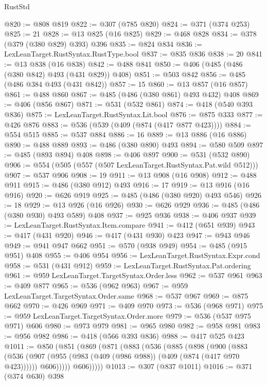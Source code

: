 \begin{lexlean}{RustStd}
\begin{coremodule}
{\begin{coremodule}
{{{{{{{{{{{@820 := @808 @819
@822 := @307 (@785 @820)
@824 := @371 (@374 @253)
@825 := 21
@828 := @13 @825 (@16 @825)
@829 := @468 @828
@834 := @378 (@379 (@380 @829) @393) @396
@835 := @824 @834
@836 := LexLeanTarget.RustSyntax.RustType.bool
@837 := @835 @836
@838 := 20
@841 := @13 @838 (@16 @838)
@842 := @488 @841
@850 := @406 (@485 (@486 (@380 @842) @493 (@431 @829)) @408)
@851 := @503 @842
@856 := @485 (@486 @384 @493 (@431 @842))
@857 := 15
@860 := @13 @857 (@16 @857)
@861 := @488 @860
@867 := @485 (@486 (@380 @861) @493 @432) @408
@869 := @406 (@856 @867)
@871 := @531 (@532 @861)
@874 := @418 (@540 @393 @836)
@875 := LexLeanTarget.RustSyntax.Lit.bool
@876 := @875 @333
@877 := @426 @876
@883 := @536 (@539 (@409 (@874 (@417 @877 @423))))
@884 := @554 @515
@885 := @537 @884
@886 := 16
@889 := @13 @886 (@16 @886)
@890 := @488 @889
@893 := @486 (@380 @890) @493
@894 := @580 @509
@897 := @485 (@893 @894) @408
@898 := @406 @897
@900 := @531 (@532 @890)
@906 := @554 (@505 (@557 (@507 LexLeanTarget.RustSyntax.Pat.wild @512)))
@907 := @537 @906
@908 := 19
@911 := @13 @908 (@16 @908)
@912 := @488 @911
@915 := @486 (@380 @912) @493
@916 := 17
@919 := @13 @916 (@16 @916)
@920 := @626 @919
@925 := @485 (@486 (@380 @920) @493 @546)
@926 := 18
@929 := @13 @926 (@16 @926)
@930 := @626 @929
@936 := @485 (@486 (@380 @930) @493 @589) @408
@937 := @925 @936
@938 := @406 @937
@939 := LexLeanTarget.RustSyntax.Item.compare
@941 := @412 (@651 @939)
@943 := @417 (@431 @920)
@946 := @417 (@431 @930) @423
@947 := @943 @946
@949 := @941 @947 @662
@951 := @570 (@938 @949)
@954 := @485 (@915 @951) @408
@955 := @406 @954
@956 := LexLeanTarget.RustSyntax.Expr.cond
@958 := @531 (@431 @912)
@959 := LexLeanTarget.RustSyntax.Pat.ordering
@961 := @959 LexLeanTarget.TargetSyntax.Order.less
@962 := @537 @961
@963 := @409 @877
@965 := @536 (@962 @963)
@967 := @959 LexLeanTarget.TargetSyntax.Order.same
@968 := @537 @967
@969 := @875 @662
@970 := @426 @969
@971 := @409 @970
@973 := @536 (@968 @971)
@975 := @959 LexLeanTarget.TargetSyntax.Order.more
@979 := @536 (@537 @975 @971) @606
@980 := @973 @979
@981 := @965 @980
@982 := @958 @981
@983 := @956 @982
@986 := @418 (@566 @393 @836)
@988 := @417 @525 @423
@1011 := @850
    (@851
      (@869
        (@871
          (@883
            (@536
              (@885
                (@898
                  (@900
                    (@883
                      (@536
                        (@907 (@955 (@983 (@409 (@986 @988)) (@409 (@874 (@417 @970 @423))))))
                        @606)))))
              @606)))))
@1013 := @307 (@837 @1011)
@1016 := @371 (@374 @630) @398
}}}}}}}}}}}
\end{coremodule}}
\end{coremodule}
\end{lexlean}
